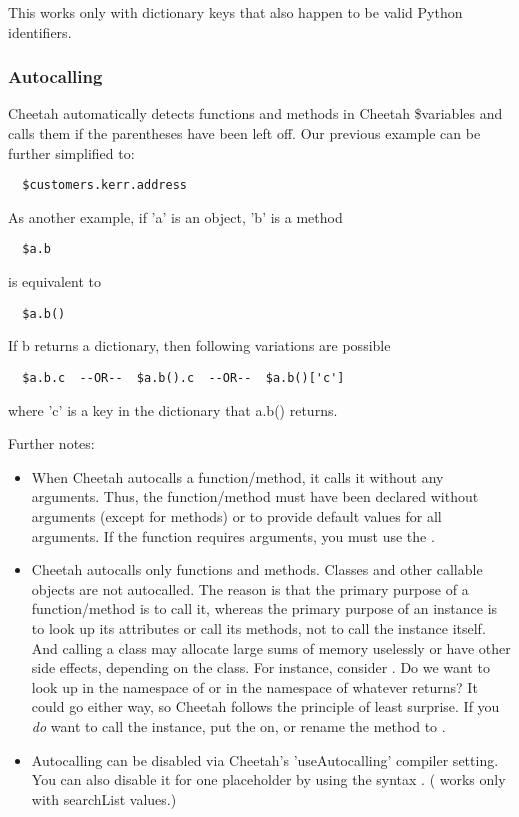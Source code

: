 This works only with dictionary keys that also happen to be valid Python
identifiers.

\subsubsection{Autocalling}
\label{language.namemapper.autocalling}

Cheetah automatically detects functions and methods in Cheetah \$variables and
calls them if the parentheses have been left off.  Our previous example can be
further simplified to:
\begin{verbatim}
  $customers.kerr.address
\end{verbatim}

As another example, if 'a' is an object, 'b' is a method
\begin{verbatim}
  $a.b
\end{verbatim}

is equivalent to

\begin{verbatim}
  $a.b()
\end{verbatim}

If b returns a dictionary, then following variations are possible
\begin{verbatim}
  $a.b.c  --OR--  $a.b().c  --OR--  $a.b()['c']
\end{verbatim}
where 'c' is a key in the dictionary that a.b() returns.

Further notes:
\begin{itemize}
\item When Cheetah autocalls a function/method, it calls it without any
arguments.  Thus, the function/method must have been declared without arguments
(except  for methods) or to provide default values for all arguments.
If the function requires arguments, you must use the \code{()}.

\item Cheetah autocalls only functions and methods.  Classes and other callable
objects are not autocalled.  The reason is that the primary purpose of a
function/method is to call it, whereas the primary purpose of an instance is to
look up its attributes or call its methods, not to call the instance itself.
And calling a class may allocate large sums of memory uselessly or have other
side effects, depending on the class.  For instance, consider
.  Do we want to look up  in the namespace
of  or in the namespace of whatever  returns?
It could go either way, so Cheetah follows the principle of least surprise.  If
you {\em do} want to call the instance, put the \code{()} on, or rename the
 method to .

\item Autocalling can be disabled via Cheetah's 'useAutocalling' compiler
setting.  You can also disable it for one placeholder by using the syntax
.  ( works
only with searchList values.)
\end{itemize}

